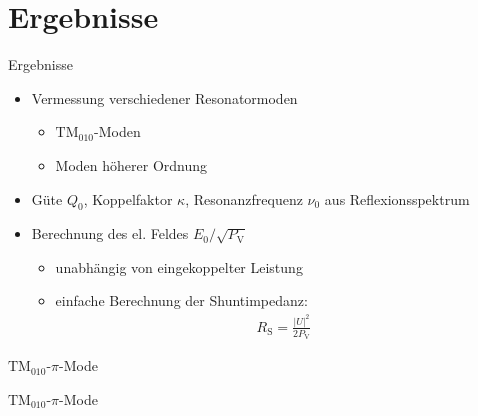 \documentclass[12pt,xcolor=dvipsnames,professionalfonts]{beamer}
\begin{document}
\section{Ergebnisse}
\begin{frame}{Ergebnisse}
	\begin{itemize}
		\setlength\itemsep{1.25em}
		\item Vermessung verschiedener Resonatormoden	
		\begin{itemize}
			\setlength\itemsep{0.25em}
			\item $\mathrm{TM}_{010}$-Moden
			\item Moden höherer Ordnung
		\end{itemize}
		
		\item Güte $Q_0$, Koppelfaktor $\kappa$, Resonanzfrequenz $\nu_0$ aus Reflexionsspektrum
		
		\item Berechnung des el. Feldes $E_0 / \sqrt{P_\mathrm{V}}$
		\begin{itemize}
			\setlength\itemsep{0.25em}
			\item unabhängig von eingekoppelter Leistung
			\item einfache Berechnung der Shuntimpedanz:
			\begin{align*}
			R_\mathrm{S} = \frac{|U|^2}{2 P_\mathrm{V}}
			\end{align*}
			
		\end{itemize}
	\end{itemize}
\end{frame}

\begin{frame}{$\text{TM}_{010}$-$\pi$-Mode}
	\centering
	
\end{frame}
\begin{frame}{$\text{TM}_{010}$-$\pi$-Mode}
	\addtocounter{framenumber}{-1}
	\centering
	
\end{frame}
\end{document}
